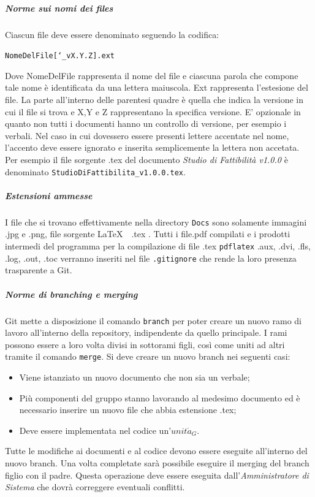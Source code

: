 			\subparagraph{Norme sui nomi dei files} \Spazio
			Ciascun file deve essere denominato seguendo la codifica:
					
					\begin{center}
						\texttt{NomeDelFile[\char`_vX.Y.Z].ext}
					\end{center}
			Dove NomeDelFile rappresenta il nome del file e ciascuna parola che compone tale nome è identificata da una lettera maiuscola. Ext rappresenta l'estesione del file. La parte all'interno delle parentesi quadre è quella che indica la versione in cui il file si trova e X,Y e Z rappresentano la specifica versione. E' opzionale in quanto non tutti i documenti hanno un controllo di versione, per esempio i verbali. Nel caso in cui dovessero essere presenti lettere accentate nel nome, l'accento deve essere ignorato e inserita semplicemente la lettera non accetata. Per esempio il file sorgente .tex del documento \emph{Studio di Fattibilità v1.0.0} è denominato \texttt{StudioDiFattibilita\_v1.0.0.tex}.
			
			\subparagraph{Estensioni ammesse} \Spazio
			I file che si trovano effettivamente nella directory \texttt{Docs} sono solamente immagini .jpg e .png, file sorgente \LaTeX $\text{ }$ .tex . Tutti i file.pdf compilati e i prodotti intermedi del programma per la compilazione di file .tex \texttt{pdflatex} .aux, .dvi, .fls, .log, .out, .toc verranno inseriti nel file \texttt{.gitignore} che rende la loro presenza trasparente a Git.
			
			\subparagraph{Norme di branching e merging} \Spazio
			Git mette a disposizione il comando \texttt{branch} per poter creare un nuovo ramo di lavoro all'interno della repository, indipendente da quello principale. I rami possono essere a loro volta divisi in sottorami figli, così come uniti ad altri tramite il comando \texttt{merge}. Si deve creare un nuovo branch nei seguenti casi:
			\begin{itemize}
				\item Viene istanziato un nuovo documento che non sia un verbale;
				\item Più componenti del gruppo stanno lavorando al medesimo documento ed è necessario inserire un nuovo file che abbia estensione .tex;
				\item Deve essere implementata nel codice un'$unit\acute{a}_G$.
			\end{itemize}
			Tutte le modifiche ai documenti e al codice devono essere eseguite all'interno del nuovo branch. Una volta completate sarà possibile eseguire il merging del branch figlio con il padre. Questa operazione deve essere eseguita dall'\emph{Amministratore di Sistema} che dovrà correggere eventuali conflitti.
			
